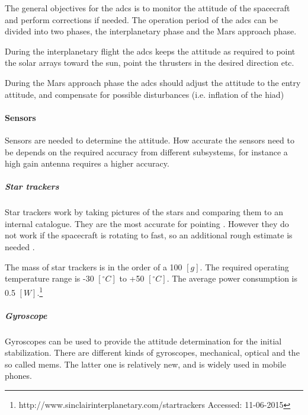 The general objectives for the \gls{adcs} is to monitor the attitude of the spacecraft and perform corrections if needed. The operation period of the \gls{adcs} can be divided into two phases, the interplanetary phase and the Mars approach phase.

During the interplanetary flight the \gls{adcs} keeps the attitude as required to point the solar arrays toward the sun, point the thrusters in the desired direction etc.

During the Mars approach phase the \gls{adcs} should adjust the attitude to the entry attitude, and compensate for possible disturbances (i.e. inflation of the \gls{hiad})



\paragraph{Sensors} Sensors are needed to determine the attitude. How accurate the sensors need to be depends on the required accuracy from different subsystems, for instance a high gain antenna requires a higher accuracy. 

\subparagraph{Star trackers}
Star trackers work by taking pictures of the stars and comparing them to an internal catalogue. They are the most accurate for pointing \cite{CarlChristianLiebe1995}. However they do not work if the spacecraft is rotating to fast, so an additional rough estimate is needed \cite[p. 584]{Wertz2011}. 

The mass of star trackers is in the order of a 100 $\left[g\right]$. The required operating temperature range is -30 $\left[^\circ C\right]$ to +50 $\left[^\circ C\right]$. The average power consumption is 0.5 $\left[W\right]$.\footnote{\label{ftn:star_tracker}http://www.sinclairinterplanetary.com/startrackers Accessed: 11-06-2015}

\subparagraph{Gyroscope}
                        
Gyroscopes can be used to provide the attitude determination for the initial stabilization. There are different kinds of gyroscopes, mechanical, optical and the so called \gls{mems}. The latter one is relatively new, and is widely used in mobile phones. 


